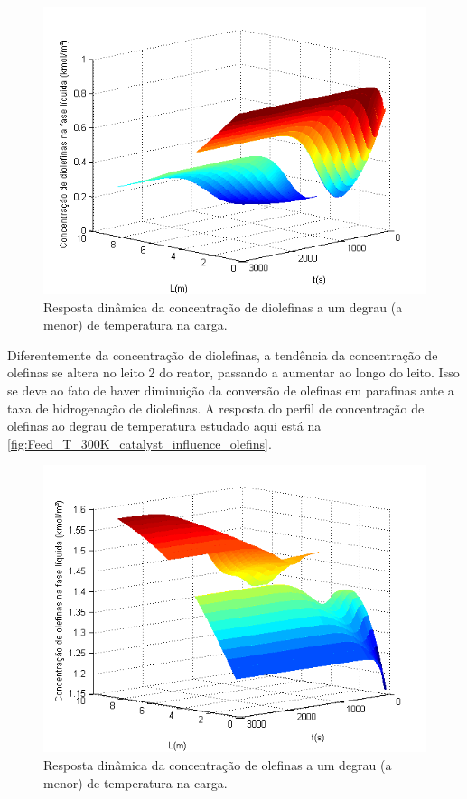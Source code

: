\begin{figure}[htb]
\centering
\includegraphics[scale=0.8]{images/Chap4/Feed_T_300K_catalyst_influence_diolefins.png}
\caption{Resposta dinâmica da concentração de diolefinas a um degrau (a menor)
de temperatura na carga.}
\label{fig:Feed_T_300K_catalyst_influence_diolefins}
\end{figure}

Diferentemente da concentração de diolefinas, a tendência da concentração de
olefinas se altera no leito 2 do reator, passando a aumentar ao longo do leito.
Isso se deve ao fato de haver diminuição da conversão de olefinas em parafinas
ante a taxa de hidrogenação de diolefinas. A resposta do perfil de concentração
de olefinas ao degrau de temperatura estudado aqui está na
\autoref{fig:Feed_T_300K_catalyst_influence_olefins}.

\begin{figure}[htb]
\centering
\includegraphics[scale=0.8]{images/Chap4/Feed_T_300K_catalyst_influence_olefins.png}
\caption{Resposta dinâmica da concentração de olefinas a um degrau (a menor) de
temperatura na carga.}
\label{fig:Feed_T_300K_catalyst_influence_olefins}
\end{figure}

